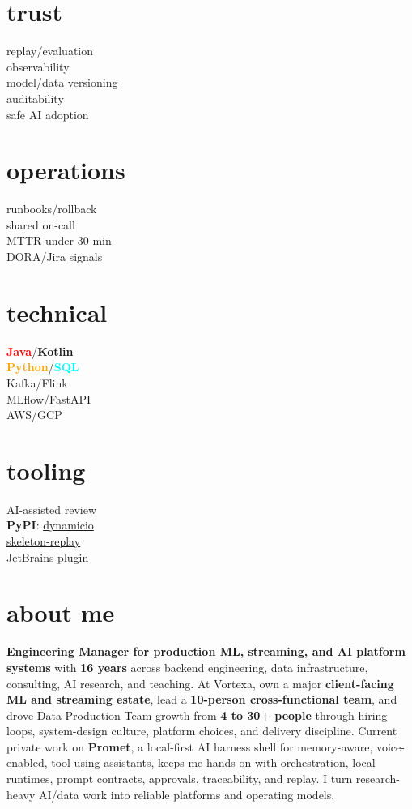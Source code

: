 \documentclass[]{../../friggeri-cv}
\begin{document}
\begin{aside}
    \section{trust}
        {\footnotesize replay/evaluation\\observability\\model/data versioning\\auditability\\safe AI adoption}
    \section{operations}
        {\footnotesize runbooks/rollback\\shared on-call\\MTTR under 30 min\\DORA/Jira signals}
    \section{technical}
        {\footnotesize \textbf{\textcolor{red}{Java}}/\textbf{\textcolor{red!50!black}{Kotlin}}\\\textbf{\textcolor{orange}{Python}}/\textbf{\textcolor{cyan}{SQL}}\\Kafka/Flink\\MLflow/FastAPI\\AWS/GCP}
    \section{tooling}
        {\footnotesize AI-assisted review\\\textbf{PyPI}: \href{https://pypi.org/project/dynamicio/}{dynamicio}\\\href{https://pypi.org/project/skeleton-replay/}{skeleton-replay}\\\href{https://plugins.jetbrains.com/plugin/32807-skeleton-replay}{JetBrains plugin}}
\end{aside}

\section{about me}
{\small \textbf{Engineering Manager for production ML, streaming, and AI platform systems} with \textbf{16 years} across backend engineering, data infrastructure, consulting, AI research, and teaching. At Vortexa, own a major \textbf{client-facing ML and streaming estate}, lead a \textbf{10-person cross-functional team}, and drove Data Production Team growth from \textbf{4 to 30+ people} through hiring loops, system-design culture, platform choices, and delivery discipline. Current private work on \textbf{Promet}, a local-first AI harness shell for memory-aware, voice-enabled, tool-using assistants, keeps me hands-on with orchestration, local runtimes, prompt contracts, approvals, traceability, and replay. I turn research-heavy AI/data work into reliable platforms and operating models.}
\end{document}
